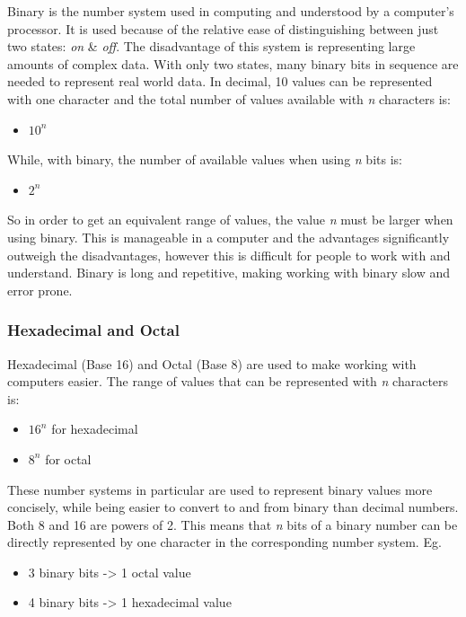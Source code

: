 \documentclass[9pt]{article}
\begin{document}
Binary is the number system used in computing and understood by a computer's processor. It is used because of the relative ease of distinguishing between just two states: \emph{on} \& \emph{off}. The disadvantage of this system is representing large amounts of complex data. With only two states, many binary bits in sequence are needed to represent real world data. In decimal, 10 values can be represented with one character and the total number of values available with \emph{n} characters is:

\begin{itemize}
\item \(10^{n}\)
\end{itemize}

While, with binary, the number of available values when using \emph{n} bits is:

\begin{itemize}
\item \(2^{n}\)
\end{itemize}

So in order to get an equivalent range of values, the value \emph{n} must be larger when using binary. This is manageable in a computer and the advantages significantly outweigh the disadvantages, however this is difficult for people to work with and understand. Binary is long and repetitive, making working with binary slow and error prone.

\subsubsection{Hexadecimal and Octal}
\label{sec:orgcf8f784}

Hexadecimal (Base 16) and Octal (Base 8) are used to make working with computers easier. The range of values that can be represented with \emph{n} characters is:

\begin{itemize}
\item \(16^{n}\) for hexadecimal
\item \(8^n\) for octal
\end{itemize}

These number systems in particular are used to represent binary values more concisely, while being easier to convert to and from binary than decimal numbers. Both 8 and 16 are powers of 2. This means that \emph{n} bits of a binary number can be directly represented by one character in the corresponding number system. Eg.

\begin{itemize}
\item 3 binary bits -> 1 octal value
\item 4 binary bits -> 1 hexadecimal value
\end{itemize}
\end{document}
